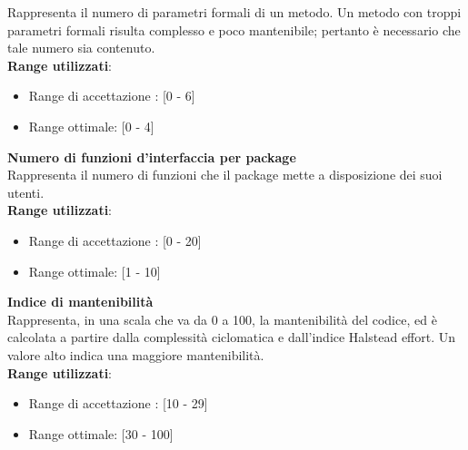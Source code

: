Rappresenta il numero di parametri formali di un metodo. Un metodo con troppi parametri formali risulta complesso e poco mantenibile; pertanto \`e necessario che tale numero sia contenuto. \\

\textbf{Range utilizzati}:
\begin{itemize}
	\item Range di accettazione : [0 - 6]
	\item Range ottimale: [0 - 4]
\end{itemize}

\textbf{Numero di funzioni d'interfaccia per package}\\

Rappresenta il numero di funzioni che il package mette a disposizione dei suoi utenti. \\

\textbf{Range utilizzati}:
\begin{itemize}
	\item Range di accettazione : [0 - 20]
	\item Range ottimale: [1 - 10]
\end{itemize}

\textbf{Indice di mantenibilit\`a}\\

Rappresenta, in una scala che va da 0 a 100, la mantenibilit\`a del codice, ed \`e calcolata a partire dalla complessit\`a ciclomatica e dall’indice Halstead effort. %
Un valore alto indica una maggiore mantenibilit\`a.\\

\textbf{Range utilizzati}:
\begin{itemize}
	\item Range di accettazione : [10 - 29]
	\item Range ottimale: [30 - 100]
\end{itemize}

